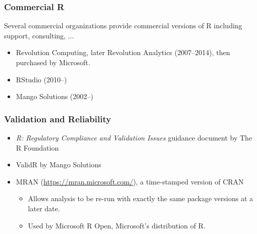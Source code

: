 \documentclass[svgnames]{beamer}
\begin{document}
\begin{frame}
  \frametitle{Commercial R}

  Several commercial organizations provide commercial versions of R
  including support, consulting, ...
  \begin{itemize}
  \item Revolution Computing, later Revolution Analytics (2007--2014),
    then purchased by Microsoft.
  \item RStudio (2010--)
  \item Mango Solutions (2002--)
  \end{itemize}

\end{frame}

\begin{frame}
  \frametitle{Validation and Reliability}
  \begin{itemize}
  \item {\em R: Regulatory Compliance and Validation Issues} guidance
    document by The R Foundation
  \item ValidR by Mango Solutions
  \item MRAN (\url{https://mran.microsoft.com/}), a time-stamped version of CRAN
    \begin{itemize}
    \item Allows analysis to be re-run with exactly the same package
      versions at a later date.
    \item Used by Microsoft R Open, Microsoft's distribution of R.
    \end{itemize}
  \end{itemize}
\end{frame}
\end{document}
